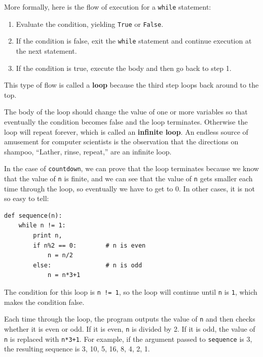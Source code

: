 \documentclass[10pt]{book}
\begin{document}

More formally, here is the flow of execution for a {\tt while} statement:

\begin{enumerate}

\item Evaluate the condition, yielding {\tt True} or {\tt False}.

\item If the condition is false, exit the {\tt while} statement
and continue execution at the next statement.

\item If the condition is true, execute the
body and then go back to step 1.

\end{enumerate}

This type of flow is called a {\bf loop} because the third step
loops back around to the top.  


The body of the loop should change the value of one or more variables
so that eventually the condition becomes false and the loop
terminates.  Otherwise the loop will repeat forever, which is called
an {\bf infinite loop}.  An endless source of amusement for computer
scientists is the observation that the directions on shampoo,
``Lather, rinse, repeat,'' are an infinite loop.


In the case of {\tt countdown}, we can prove that the loop
terminates because we know that the value of {\tt n} is finite, and we
can see that the value of {\tt n} gets smaller each time through the
loop, so eventually we have to get to 0.  In other
cases, it is not so easy to tell:

\beforeverb
\begin{verbatim}
def sequence(n):
    while n != 1:
        print n,
        if n%2 == 0:        # n is even
            n = n/2
        else:               # n is odd
            n = n*3+1
\end{verbatim}
\afterverb
%
The condition for this loop is {\tt n != 1}, so the loop will continue
until {\tt n} is {\tt 1}, which makes the condition false.

Each time through the loop, the program outputs the value of {\tt n}
and then checks whether it is even or odd.  If it is even, {\tt n} is 
divided by 2.  If it is odd, the value of {\tt n} is replaced with
{\tt n*3+1}. For example, if the argument passed
to {\tt sequence} is 3, the resulting sequence is 3, 10, 5, 16, 8, 4, 2, 1.
\end{document}
